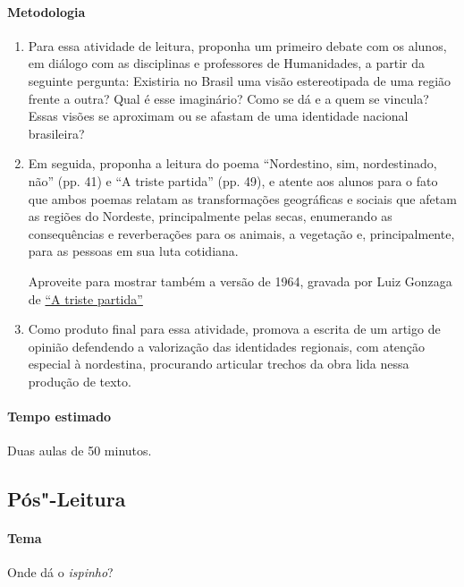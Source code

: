 \documentclass[12pt]{extarticle}
\begin{document}
\paragraph{Metodologia}

\begin{enumerate}
\item
Para essa atividade de leitura, proponha um primeiro debate com os alunos,
em diálogo com as disciplinas e professores de Humanidades, a partir da 
seguinte pergunta: 
Existiria no Brasil uma visão estereotipada de uma região frente a outra? 
Qual é esse imaginário? Como se dá e a quem se vincula? Essas visões se 
aproximam ou se afastam de uma identidade nacional brasileira?

\item
Em seguida, proponha a leitura do poema ``Nordestino, sim, nordestinado, 
não'' (pp. 41) e ``A triste partida'' (pp. 49), e atente aos alunos para 
o fato que ambos poemas relatam as transformações geográficas e sociais 
que afetam as regiões do Nordeste, principalmente pelas secas, enumerando 
as consequências e reverberações para os animais, a vegetação e, 
principalmente, para as pessoas em sua luta cotidiana. 

Aproveite para mostrar também a versão de 1964, gravada por Luiz Gonzaga 
de \href{https://www.youtube.com/watch?v=Yu0bvuK8s_k&ab_channel=EllisStoffel}{``A triste partida''}

\item
Como produto final para essa atividade, promova a escrita de um artigo de 
opinião defendendo a valorização das identidades regionais, com atenção 
especial à nordestina, procurando articular trechos da obra lida nessa 
produção de texto. 

\end{enumerate}

\paragraph{Tempo estimado} Duas aulas de 50 minutos.  

\subsection{Pós"-Leitura}

\paragraph{Tema} Onde dá o \textit{ispinho}?
\end{document}
